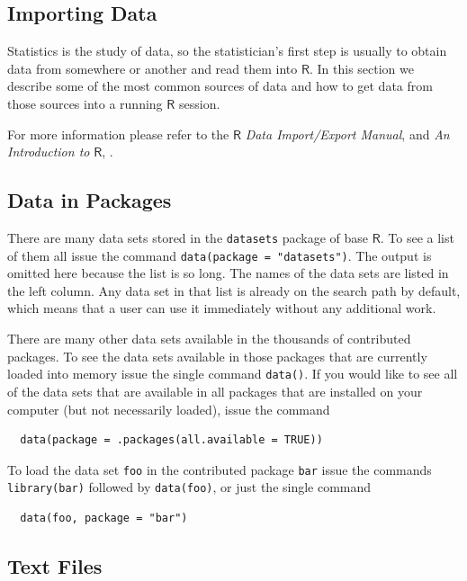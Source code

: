 \documentclass[captions=tableheading]{scrbook}
\begin{document}
\begin{example}
\section{Importing Data}
\label{sec-20-2}
\label{sec-Importing-A-Data}


Statistics is the study of data, so the statistician's first step is usually to obtain data from somewhere or another and read them into \(\mathsf{R}\). In this section we describe some of the most common sources of data and how to get data from those sources into a running \(\mathsf{R}\) session.

For more information please refer to the \(\mathsf{R}\) \emph{Data Import/Export Manual}, \cite{rstatenv} and \emph{An Introduction to} \(\mathsf{R}\), \cite{Venables2010}.
\subsection{Data in Packages}
\label{sec-20-2-1}


There are many data sets stored in the \texttt{datasets} package of base \(\mathsf{R}\). To see a list of them all issue the command \texttt{data(package = "datasets")}. The output is omitted here because the list is so long. The names of the data sets are listed in the left column. Any data set in that list is already on the search path by default, which means that a user can use it immediately without any additional work. 

There are many other data sets available in the thousands of contributed packages. To see the data sets available in those packages that are currently loaded into memory issue the single command \texttt{data()}. If you would like to see all of the data sets that are available in all packages that are installed on your computer (but not necessarily loaded), issue the command 

\begin{verbatim}
  data(package = .packages(all.available = TRUE))
\end{verbatim}

To load the data set \texttt{foo} in the contributed package \texttt{bar} issue the commands \texttt{library(bar)} followed by \texttt{data(foo)}, or just the single command  

\begin{verbatim}
  data(foo, package = "bar")
\end{verbatim}
\subsection{Text Files}
\label{sec-20-2-2}


\end{example}
\end{document}
